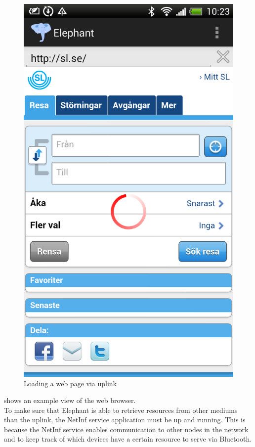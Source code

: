 \begin{figure}
\centering
\includegraphics[scale=0.29]{img/loaded_page.png}
\caption{Loading a web page via uplink}\label{fig:loaded_page}
\end{figure}

 shows an example view of the web browser.\\


To make sure that Elephant is able to retrieve resources from other mediums than the uplink, the NetInf service application must be up and running.
This is because the NetInf service enables communication to other nodes in the network and to keep track of which devices have a certain resource to serve via Bluetooth.

